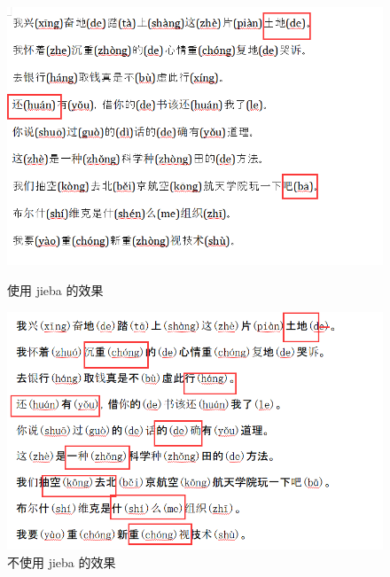 \documentclass[12pt,hyperref,a4paper,UTF8]{ctexart}
\begin{document}
\begin{figure}[htbp]
    \centering
    \begin{minipage}[b]{0.45\textwidth}
        \centering
        \includegraphics[width=\textwidth]{figures/image7.png} %
        \caption{使用 jieba 的效果}
        \label{fig:image7}
    \end{minipage}
    \hspace{0.05\textwidth} %
    \begin{minipage}[b]{0.45\textwidth}
        \centering
        \includegraphics[width=\textwidth]{figures/image8.png} %
        \caption{不使用 jieba 的效果}
        \label{fig:image8}
    \end{minipage}
\end{figure}
\end{document}

